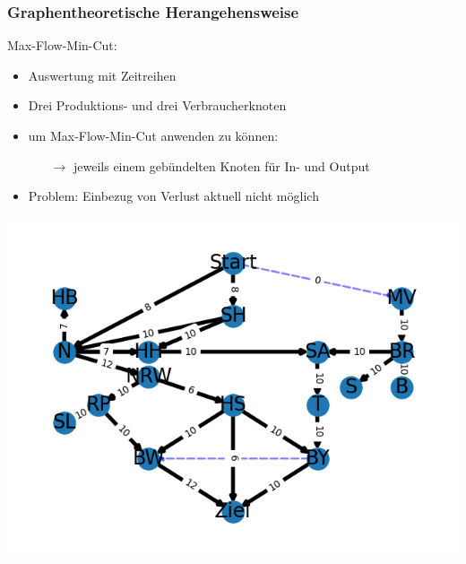 \documentclass[aspectratio=169,t]{beamer}
\begin{document}
	\begin{frame}
		\frametitle{Graphentheoretische Herangehensweise}
		\vspace*{2mm}
		\begin{minipage}{1\linewidth}
			\begin{minipage}{.4\linewidth}
				\vspace*{-8mm}
				Max-Flow-Min-Cut:
				\begin{itemize}
					
					\item Auswertung mit Zeitreihen
						\vspace*{2mm}
					
					\item Drei Produktions- und drei Verbraucherknoten
						\vspace*{2mm}
						
					\item um Max-Flow-Min-Cut anwenden zu können:
						\vspace*{2mm}
						\begin{itemize}
							\item [$\rightarrow$] jeweils einem gebündelten Knoten für In- und Output
							 
						\end{itemize}
					
					
					\vspace*{2mm}
					\item Problem: Einbezug von Verlust aktuell nicht möglich
									
					
				\end{itemize}
		
			\end{minipage}
			\hfill
			\begin{minipage}{.6\linewidth}
				\centering
				\includegraphics[width=.9\linewidth]{Figure_4.png}
				
			\end{minipage}
		\end{minipage}	
		
		
		
	\end{frame}
\end{document}
